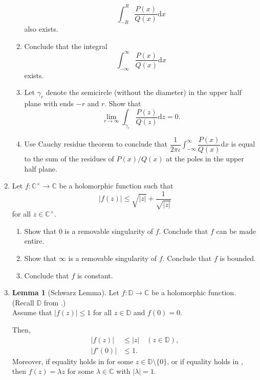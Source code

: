 \documentclass[12pt]{article}
\theoremstyle{definition}
\numberwithin{thm}{section}
\newtheorem{lem}[thm]{Lemma}
\newcommand{\md}[1]{{\left\lvert #1 \right\lvert}}
\begin{document}
\begin{enumerate}
\begin{enumerate}
\begin{equation*}
			\int_{-R}^{R} \dfrac{P(x)}{Q(x)} {\mathrm{d}}x
		\end{equation*}
		also exists.
		\item Conclude that the integral
		\begin{equation*} 
			\int_{-\infty}^{\infty} \dfrac{P(x)}{Q(x)} {\mathrm{d}}x
		\end{equation*}
		exists.
		\item Let $\gamma_r$ denote the semicircle (without the diameter) in the upper half plane with ends $-r$ and $r.$ Show that 
		\begin{equation*} 
			\lim_{r\to \infty}\int_{\gamma_r}^{} \dfrac{P(z)}{Q(z)} {\mathrm{d}}z = 0.
		\end{equation*}
		\item Use Cauchy residue theorem to conclude that $\displaystyle\dfrac{1}{2\pi\iota}\int_{-\infty}^{\infty} \dfrac{P(x)}{Q(x)} {\mathrm{d}}x$ is equal to the sum of the residues of $P(x)/Q(x)$ at the poles in the upper half plane.
	\end{enumerate}
	\item Let $f:\mathbb{C}^\times\to\mathbb{C}$ be a holomorphic function such that 
	\begin{equation*} 
		|f(z)| \le \sqrt{|z|} + \dfrac{1}{\sqrt{|z|}}
	\end{equation*}
	for all $z \in \mathbb{C}^\times.$ 
	\begin{enumerate}
		\item Show that $0$ is a removable singularity of $f.$ Conclude that $f$ can be made entire.
		\item Show that $\infty$ is a removable singularity of $f.$ Conclude that $f$ is bounded.
		\item Conclude that $f$ is constant.
	\end{enumerate}
	\item \begin{lem}[Schwarz Lemma]
	Let $f : \mathbb{D} \to \mathbb{C}$ be a holomorphic function. (Recall $\mathbb{D}$ from .) \\
	Assume that $\md{f(z)} \le 1$ for all $z \in \mathbb{D}$ and $f(0) = 0$. 

	Then,
	\begin{align} 
		\md{f(z)} &\le \md{z} \quad (z \in \mathbb{D}), \label{eq:01}\\
		\md{f'(0)} &\le 1. \label{eq:02}
	\end{align}
	Moreover, if equality holds in  for some $z \in \mathbb{D} \setminus \{0\}$, or if equality holds in , then $f(z) = \lambda z$ for some $\lambda \in \mathbb{C}$ with $\md{\lambda} = 1$.
	\end{lem}


\end{enumerate}
\end{document}
